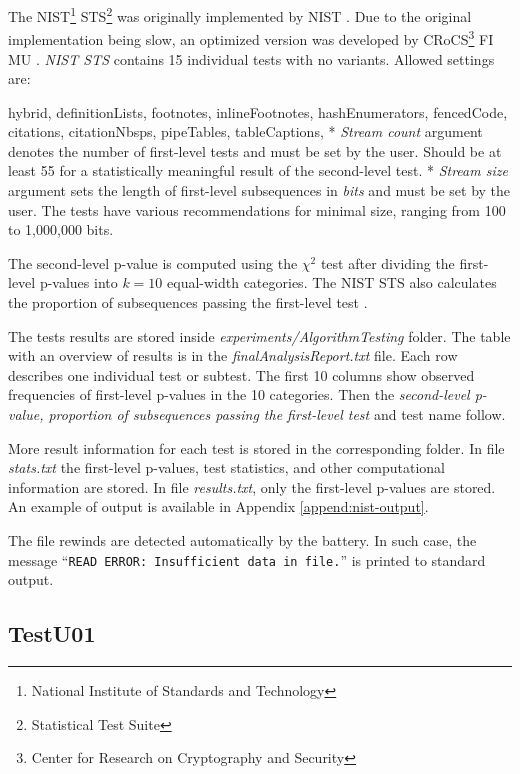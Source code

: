 \documentclass[
  digital,     %
  oneside,     %
  nosansbold,  %
  nocolorbold, %
  nolof,         %
  nolot,         %
]{fithesis4}
\begin{document}
The NIST\footnote{National Institute of Standards and Technology} STS\footnote{Statistical Test Suite} \cite{nist_special} was originally implemented by NIST \cite{nist_site}. Due to the original implementation being slow, an optimized version \cite{nist-opt} was developed by CRoCS\footnote{Center for Research on Cryptography and Security} FI MU \cite{nist_faster}. \emph{NIST STS} contains 15 individual tests with no variants. Allowed settings are:
\begin{markdown*}{%
  hybrid,
  definitionLists,
  footnotes,
  inlineFootnotes,
  hashEnumerators,
  fencedCode,
  citations,
  citationNbsps,
  pipeTables,
  tableCaptions,
}
* \emph{Stream count} argument denotes the number of first-level tests and must be set by the user. Should be at least 55 for a statistically meaningful result of the second-level test. 
* \emph{Stream size} argument sets the length of first-level subsequences in \emph{bits} and must be set by the user. The tests have various recommendations for minimal size, ranging from 100 to 1,000,000 bits.
\end{markdown*}

The second-level p-value is computed using the $\chi^2$ test after dividing the first-level p-values into $k=10$ equal-width categories. The NIST STS also calculates the proportion of subsequences passing the first-level test \cite[p. 4-1]{nist_special}.

The tests results are stored inside \emph{experiments/AlgorithmTesting} folder. The table with an overview of results is in the \emph{finalAnalysisReport.txt} file. Each row describes one individual test or subtest. The first 10 columns show observed frequencies of first-level p-values in the 10 categories. Then the \emph{second-level p-value, proportion of subsequences passing the first-level test} and test name follow. 

More result information for each test is stored in the corresponding folder. In file \emph{stats.txt} the first-level p-values, test statistics, and other computational information are stored. In file \emph{results.txt}, only the first-level p-values are stored. An example of output is available in Appendix \ref{append:nist-output}.

The file rewinds are detected automatically by the battery. In such case, the message ``\texttt{READ ERROR:  Insufficient data in file.}'' is printed to standard output.


\subsection{TestU01} \label{chap:sols-testu01}
\end{document}
